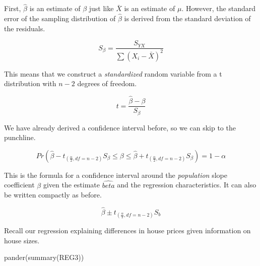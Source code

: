 \documentclass[
]{book}
\newenvironment{Shaded}{\begin{snugshade}}{\end{snugshade}}
\newcommand{\FunctionTok}[1]{\textcolor[rgb]{0.00,0.00,0.00}{#1}}
\newcommand{\NormalTok}[1]{#1}
\begin{document}
First, \(\hat{\beta}\) is an estimate of \(\beta\) just like \(\bar{X}\) is an estimate of \(\mu\). However, the standard error of the sampling distribution of \(\hat{\beta}\) is derived from the standard deviation of the residuals.

\[S_\beta=\frac{S_{YX}}{\sum{(X_i-\bar{X})^2}}\]

This means that we construct a \emph{standardized} random variable from a t distribution with \(n-2\) degrees of freedom.

\[t=\frac{\hat{\beta}-\beta}{S_\beta}\]

We have already derived a confidence interval before, so we can skip to the punchline.

\[Pr\left(\hat{\beta}-t_{(\frac{\alpha}{2},df=n-2)}S_\beta \leq \beta \leq \hat{\beta}+t_{(\frac{\alpha}{2},df=n-2)}S_\beta\right)=1-\alpha\]

This is the formula for a confidence interval around the \emph{population} slope coefficient \(\beta\) given the estimate \(\hat{beta}\) and the regression characteristics. It can also be written compactly as before.

\[\hat{\beta} \pm t_{(\frac{\alpha}{2},df=n-2)} S_b\]

Recall our regression explaining differences in house prices given information on house sizes.

\begin{Shaded}
\begin{Highlighting}[]
\FunctionTok{pander}\NormalTok{(}\FunctionTok{summary}\NormalTok{(REG3))}
\end{Highlighting}
\end{Shaded}
\end{document}
